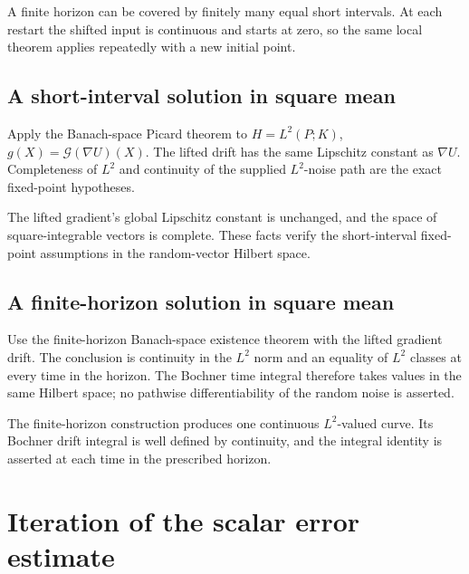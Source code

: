 \documentclass[11pt,a4paper]{report}
\begin{document}
A finite horizon can be covered by finitely many equal short intervals. At each restart the shifted input is continuous and starts at zero, so the same local theorem applies repeatedly with a new initial point.

\subsection{\texorpdfstring{A short-interval solution in square mean}{A short-interval solution in square mean}}
\label{report-step-UnadjustedLangevin-LangevinIntegral-lean-4}


Apply the Banach-space Picard theorem to \(H=L^2(P;K)\), \(g(X)=\mathcal G(\nabla U)(X)\). The lifted drift has the same Lipschitz constant as \(\nabla U\). Completeness of \(L^2\) and continuity of the supplied \(L^2\)-noise path are the exact fixed-point hypotheses.



The lifted gradient's global Lipschitz constant is unchanged, and the space of square-integrable vectors is complete. These facts verify the short-interval fixed-point assumptions in the random-vector Hilbert space.

\subsection{\texorpdfstring{A finite-horizon solution in square mean}{A finite-horizon solution in square mean}}
\label{report-step-UnadjustedLangevin-LangevinIntegral-lean-5}


Use the finite-horizon Banach-space existence theorem with the lifted gradient drift. The conclusion is continuity in the \(L^2\) norm and an equality of \(L^2\) classes at every time in the horizon. The Bochner time integral therefore takes values in the same Hilbert space; no pathwise differentiability of the random noise is asserted.



The finite-horizon construction produces one continuous \(L^2\)-valued curve. Its Bochner drift integral is well defined by continuity, and the integral identity is asserted at each time in the prescribed horizon.

\section{\texorpdfstring{Iteration of the scalar error estimate}{Iteration of the scalar error estimate}}
\label{proof-module-UnadjustedLangevin-Recurrence-lean}
\end{document}
